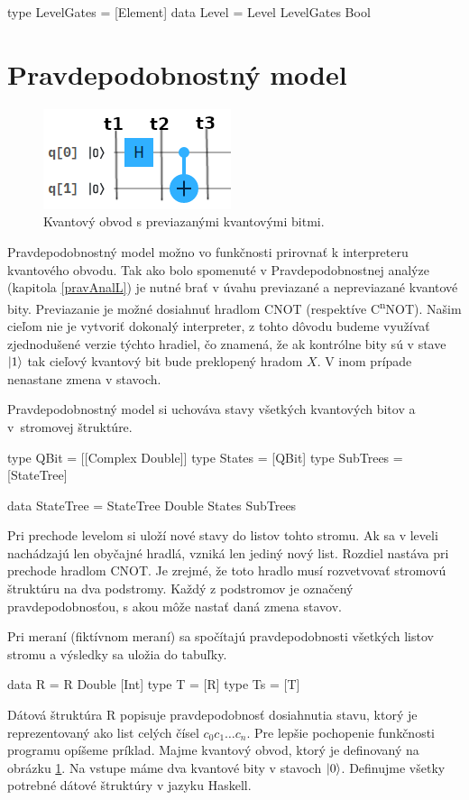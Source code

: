 \begin{code}
type LevelGates = [Element]
data Level = Level LevelGates Bool
\end{code}

\section{Pravdepodobnostný model}

\begin{figure}
	\centering 
	\includegraphics[width=.4\textwidth]{figures/circuit3.png} 
	\caption{Kvantový obvod s previazanými kvantovými bitmi.}
    \label{obvod}
\end{figure}

Pravdepodobnostný model možno vo funkčnosti prirovnať k interpreteru
kvantového obvodu. Tak ako bolo spomenuté v Pravdepodobnostnej analýze 
(kapitola \ref{pravAnalL}) je nutné brať v úvahu previazané a nepreviazané
kvantové bity. Previazanie je možné dosiahnuť hradlom CNOT (respektíve
C\textsuperscript{n}NOT). Našim cieľom nie je vytvoriť dokonalý interpreter,
z tohto dôvodu budeme využívať zjednodušené verzie týchto hradiel, čo znamená,
že ak kontrólne bity sú v stave \(\ket{1}\) tak cieľový kvantový bit bude 
preklopený hradom \(X\). V inom prípade nenastane zmena v stavoch.


Pravdepodobnostný model si uchováva stavy všetkých kvantových bitov a 
v~stromovej štruktúre. 
\begin{code}
type QBit = [[Complex Double]]
type States = [QBit]
type SubTrees = [StateTree]

data StateTree = StateTree Double States SubTrees
\end{code}

Pri prechode levelom si uloží nové stavy do listov
tohto stromu. Ak sa v leveli nachádzajú len obyčajné hradlá, vzniká len
jediný nový list. Rozdiel nastáva pri prechode hradlom CNOT. Je zrejmé, že 
toto hradlo musí rozvetvovať stromovú štruktúru na dva podstromy. Každý z 
podstromov je označený pravdepodobnosťou, s akou môže nastať daná zmena 
stavov. 

Pri meraní (fiktívnom meraní) sa spočítajú pravdepodobnosti všetkých listov
stromu a výsledky sa uložia do tabuľky. 
\begin{code}
data R = R Double [Int]
type T = [R]
type Ts = [T]
\end{code}
Dátová štruktúra R popisuje pravdepodobnosť dosiahnutia stavu, ktorý je 
reprezentovaný ako list celých čísel \(c_0c_1 \dots c_n\).
Pre lepšie pochopenie funkčnosti 
programu opíšeme príklad. Majme kvantový obvod, ktorý je definovaný na 
obrázku \ref{obvod}. Na vstupe máme dva kvantové bity v stavoch \(\ket{0}\).
Definujme všetky potrebné dátové štruktúry v jazyku Haskell. 

